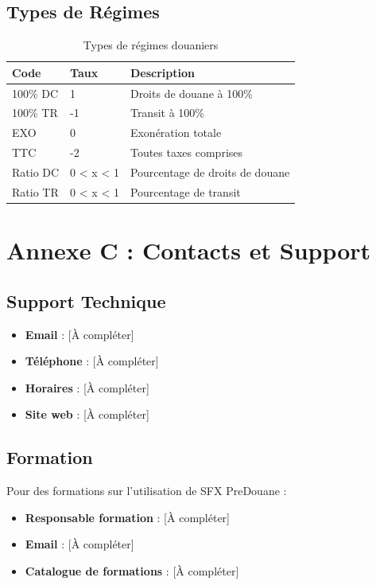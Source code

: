 \documentclass[12pt,a4paper]{report}
\begin{document}
\section{Types de Régimes}

\begin{table}[H]
\centering
\begin{tabular}{|l|l|p{6cm}|}
\hline
\textbf{Code} & \textbf{Taux} & \textbf{Description} \\
\hline
100\% DC & 1 & Droits de douane à 100\% \\
\hline
100\% TR & -1 & Transit à 100\% \\
\hline
EXO & 0 & Exonération totale \\
\hline
TTC & -2 & Toutes taxes comprises \\
\hline
Ratio DC & 0 < x < 1 & Pourcentage de droits de douane \\
\hline
Ratio TR & 0 < x < 1 & Pourcentage de transit \\
\hline
\end{tabular}
\caption{Types de régimes douaniers}
\end{table}

\chapter{Annexe C : Contacts et Support}

\section{Support Technique}

\begin{itemize}[leftmargin=*]
    \item \textbf{Email} : [À compléter]
    \item \textbf{Téléphone} : [À compléter]
    \item \textbf{Horaires} : [À compléter]
    \item \textbf{Site web} : [À compléter]
\end{itemize}

\section{Formation}

Pour des formations sur l'utilisation de SFX PreDouane :

\begin{itemize}[leftmargin=*]
    \item \textbf{Responsable formation} : [À compléter]
    \item \textbf{Email} : [À compléter]
    \item \textbf{Catalogue de formations} : [À compléter]
\end{itemize}
\end{document}
